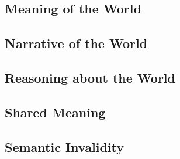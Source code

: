\subsection{Meaning of the World}


\subsection{Narrative of the World}

\subsection{Reasoning about the World}


\subsection{Shared Meaning}

\subsection{Semantic Invalidity}





